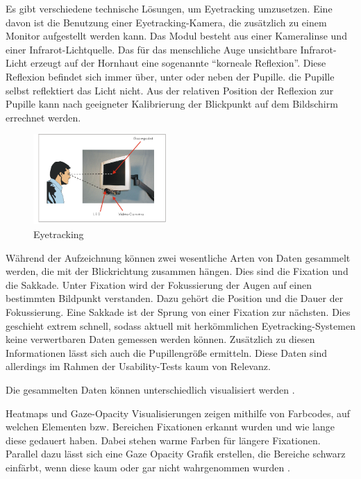 Es gibt verschiedene technische Lösungen, um Eyetracking umzusetzen. Eine davon ist die Benutzung einer Eyetracking-Kamera, die zusätzlich zu einem Monitor aufgestellt werden kann. Das Modul besteht aus einer Kameralinse und einer Infrarot-Lichtquelle. Das für das menschliche Auge unsichtbare Infrarot-Licht erzeugt auf der Hornhaut eine sogenannte \enquote{korneale Reflexion}. Diese Reflexion befindet sich immer über, unter oder neben der Pupille. die Pupille selbst reflektiert das Licht nicht. Aus der relativen Position der Reflexion zur Pupille kann nach geeigneter Kalibrierung der Blickpunkt auf dem Bildschirm errechnet werden.\par
\begin{figure}[H]
 \centering
 \includegraphics[width=0.45\textwidth]{grafiken/eyegaze.png}
 \caption[Eyetracking]{Eyetracking \cite{Eyegaze}}
 \label{fig:eyetracking}
\end{figure}
Während der Aufzeichnung können zwei wesentliche Arten von Daten gesammelt werden, die mit der Blickrichtung zusammen hängen. Dies sind die Fixation und die Sakkade. Unter Fixation wird der Fokussierung der Augen auf einen bestimmten Bildpunkt verstanden. Dazu gehört die Position und die Dauer der Fokussierung. Eine Sakkade ist der Sprung von einer Fixation zur nächsten. Dies geschieht extrem schnell, sodass aktuell mit herkömmlichen Eyetracking-Systemen keine verwertbaren Daten gemessen werden können. Zusätzlich zu diesen Informationen lässt sich auch die Pupillengröße ermitteln. Diese Daten sind allerdings im Rahmen der Usability-Tests kaum von Relevanz.\par
Die gesammelten Daten können unterschiedlich visualisiert werden \cite{Henrici2010}.\par
Heatmaps und Gaze-Opacity Visualisierungen  zeigen mithilfe von Farbcodes, auf welchen Elementen bzw. Bereichen Fixationen erkannt wurden und wie lange diese gedauert haben. Dabei stehen warme Farben für längere Fixationen. Parallel dazu lässt sich eine Gaze Opacity Grafik erstellen, die Bereiche schwarz einfärbt, wenn diese kaum oder gar nicht wahrgenommen wurden \cite{Henrici2010}.
